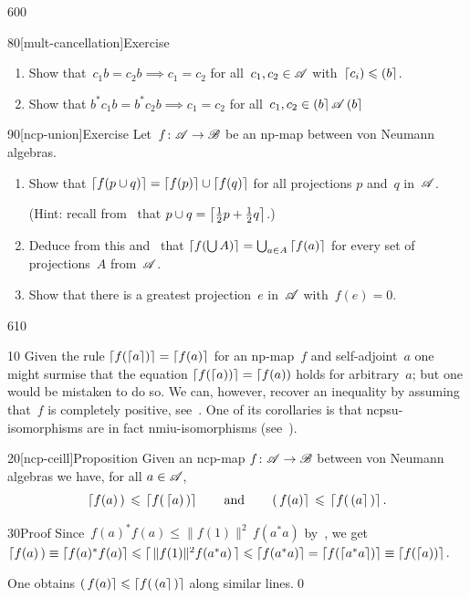 \begin{parsec}{600}
\begin{point}{80}[mult-cancellation]{Exercise}
\begin{enumerate}
(Hint: if $cb=0$,
then $\ceil{b^*c^*cb}\equiv \ceil{b^*\ceil{c^*c}b}=0$
by~.)
\item
Show that~$c_1b=c_2b \implies c_1=c_2$
for all~$c_1,c_2\in\mathscr{A}$
with~$\left\lceil c_i\right)\leqslant \left(b\right\rceil$.
\item
Show that $b^*c_1b=b^*c_2b\implies c_1=c_2$
for all~$c_1,c_2\in\left(b\right\rceil\mathscr{A}\left(b\right\rceil$
\end{enumerate}
\spacingfix%
\end{point}%
\begin{point}{90}[ncp-union]{Exercise}%
Let~$f\colon \mathscr{A}\to\mathscr{B}$ be an np-map
between von Neumann algebras.
\begin{enumerate}
\item
Show that
$\left\lceil f(p\cup q)\right\rceil
= \left\lceil f(p)\right\rceil\cup\left\lceil f(q)\right\rceil$
for all projections $p$ and~$q$ in~$\mathscr{A}$.

(Hint: recall from~ 
that $p\cup q = \left\lceil\frac{1}{2}p+\frac{1}{2}q\right\rceil$.)

\item
Deduce from this and~ that $\left\lceil f(\bigcup A)\right\rceil=\bigcup_{a\in A}\left\lceil f(a)\right\rceil$
for every set of projections~$A$ from~$\mathscr{A}$.

\item
Show that there is a greatest projection~$e$
in~$\mathscr{A}$ with~$f(e)=0$.
\end{enumerate}
\spacingfix%
\end{point}%
\end{parsec}%
\begin{parsec}{610}%
\begin{point}{10}%
Given the rule $\left\lceil f(\left\lceil a\right\rceil)\right\rceil=\left\lceil f(a)\right\rceil$
for an np-map~$f$ and self-adjoint~$a$
one might surmise that
the equation $\left\lceil f(\left\lceil a\right))\right\rceil=\left\lceil f(a)\right)$
holds 
for arbitrary~$a$;
but
one would be mistaken to do so.
We can, however,
recover an inequality
by assuming that~$f$ is completely positive, see~.
One of its corollaries is
that ncpsu-isomorphisms
are in fact nmiu-isomorphisms (see~).
\end{point}
\begin{point}{20}[ncp-ceill]{Proposition}%
Given an ncp-map $f\colon \mathscr{A}\to\mathscr{B}$
between von Neumann algebras
we have,
for all
$a\in\mathscr{A}$,
\begin{equation*}
	\left\lceil f(a)\,\right)\,\leqslant\,\left\lceil f(\,\left\lceil a\right)\,)\right\rceil
	\qquad\text{and}\qquad
	\left(\,f(a)\right\rceil\,\leqslant\,\left\lceil f(\,\left(a\right\rceil\,)\right\rceil.
\end{equation*}
\spacingfix%
\begin{point}{30}{Proof}%
Since~$f(a)^*f(a)\leq \|f(1)\|^2\,f(a^*a)$
 by~,
we get~$\left\lceil f(a)\,\right)\equiv \left\lceil f(a)^*f(a)\right\rceil
	\leqslant \left\lceil\,\smash{\|f(1)\|^2f(a^*a)}\,\right\rceil
	\leqslant \left\lceil f(a^*a)\right\rceil
	=\left\lceil f(\left\lceil a^*a\right\rceil)\right\rceil
	\equiv \left\lceil f(\left\lceil a\right))\right\rceil$.

One obtains $\left(\,f(a)\right\rceil\leqslant\left\lceil f(\,\left(a\right\rceil\,)\right\rceil$
along similar lines.\qed
\end{point}
\end{point}
\end{parsec}%

